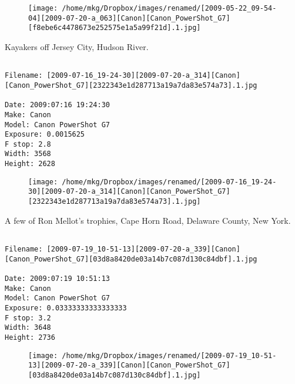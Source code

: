 \begin{figure}
\texttt{[image: /home/mkg/Dropbox/images/renamed/[2009-05-22\_09-54-04][2009-07-20-a\_063][Canon][Canon\_PowerShot\_G7][f8ebe6c4478673e252575e1a5a99f21d].1.jpg]}
\end{figure}
    
\clearpage
\onecolumn
\noindent Kayakers off Jersey City, Hudson River.
\noindent
\begin{lstlisting}

Filename: [2009-07-16_19-24-30][2009-07-20-a_314][Canon][Canon_PowerShot_G7][2322343e1d287713a19a7da83e574a73].1.jpg

Date: 2009:07:16 19:24:30
Make: Canon
Model: Canon PowerShot G7
Exposure: 0.0015625
F stop: 2.8
Width: 3568
Height: 2628
\end{lstlisting}
\clearpage

\begin{figure}
\texttt{[image: /home/mkg/Dropbox/images/renamed/[2009-07-16\_19-24-30][2009-07-20-a\_314][Canon][Canon\_PowerShot\_G7][2322343e1d287713a19a7da83e574a73].1.jpg]}
\end{figure}
    
\clearpage
\onecolumn
\noindent A few of Ron Mellot's trophies, Cape Horn Road, Delaware County, New York.
\noindent
\begin{lstlisting}

Filename: [2009-07-19_10-51-13][2009-07-20-a_339][Canon][Canon_PowerShot_G7][03d8a8420de03a14b7c087d130c84dbf].1.jpg

Date: 2009:07:19 10:51:13
Make: Canon
Model: Canon PowerShot G7
Exposure: 0.03333333333333333
F stop: 3.2
Width: 3648
Height: 2736
\end{lstlisting}
\clearpage

\begin{figure}
\texttt{[image: /home/mkg/Dropbox/images/renamed/[2009-07-19\_10-51-13][2009-07-20-a\_339][Canon][Canon\_PowerShot\_G7][03d8a8420de03a14b7c087d130c84dbf].1.jpg]}
\end{figure}
    
